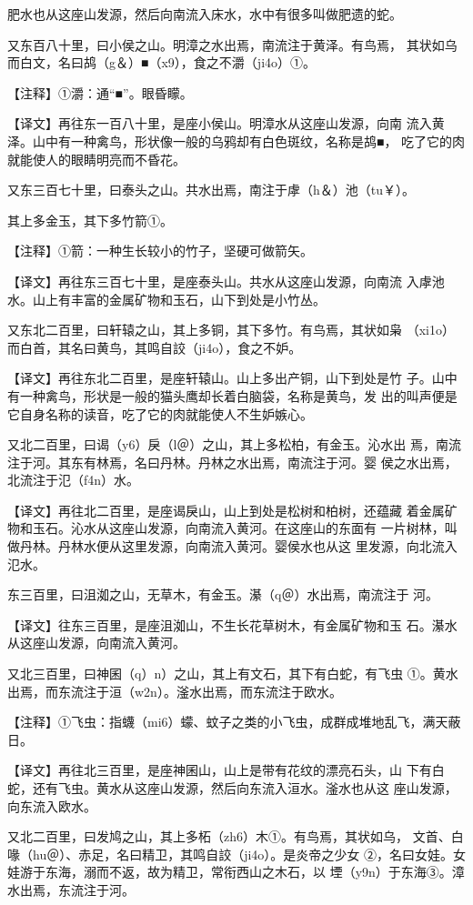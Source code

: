 \documentclass[a4paper,12pt,UTF8,twoside]{ctexbook}
\begin{document}
肥水也从这座山发源，然后向南流入床水，水中有很多叫做肥遗的蛇。

又东百八十里，曰小侯之山。明漳之水出焉，南流注于黄泽。有鸟焉， 其状如乌而白文，名曰鸪（g＆）■（x9），食之不灂（ji4o）①。

【注释】①灂：通“■”。眼昏矇。

【译文】再往东一百八十里，是座小侯山。明漳水从这座山发源，向南 流入黄泽。山中有一种禽鸟，形状像一般的乌鸦却有白色斑纹，名称是鸪■， 吃了它的肉就能使人的眼睛明亮而不昏花。

又东三百七十里，曰泰头之山。共水出焉，南注于虖（h＆）池（tu￥）。

其上多金玉，其下多竹箭①。

【注释】①箭：一种生长较小的竹子，坚硬可做箭矢。

【译文】再往东三百七十里，是座泰头山。共水从这座山发源，向南流 入虖池水。山上有丰富的金属矿物和玉石，山下到处是小竹丛。

又东北二百里，曰轩辕之山，其上多铜，其下多竹。有鸟焉，其状如枭 （xi1o）而白首，其名曰黄鸟，其鸣自詨（ji4o），食之不妒。

【译文】再往东北二百里，是座轩辕山。山上多出产铜，山下到处是竹 子。山中有一种禽鸟，形状是一般的猫头鹰却长着白脑袋，名称是黄鸟，发 出的叫声便是它自身名称的读音，吃了它的肉就能使人不生妒嫉心。

又北二百里，曰谒（y6）戾（l＠）之山，其上多松柏，有金玉。沁水出 焉，南流注于河。其东有林焉，名曰丹林。丹林之水出焉，南流注于河。婴 侯之水出焉，北流注于氾（f4n）水。

【译文】再往北二百里，是座谒戾山，山上到处是松树和柏树，还蕴藏 着金属矿物和玉石。沁水从这座山发源，向南流入黄河。在这座山的东面有 一片树林，叫做丹林。丹林水便从这里发源，向南流入黄河。婴侯水也从这 里发源，向北流入氾水。

东三百里，曰沮洳之山，无草木，有金玉。濝（q＠）水出焉，南流注于 河。

【译文】往东三百里，是座沮洳山，不生长花草树木，有金属矿物和玉 石。濝水从这座山发源，向南流入黄河。

又北三百里，曰神囷（q）n）之山，其上有文石，其下有白蛇，有飞虫 ①。黄水出焉，而东流注于洹（w2n）。滏水出焉，而东流注于欧水。

【注释】①飞虫：指蠛（mi6）蠓、蚊子之类的小飞虫，成群成堆地乱飞，满天蔽日。

【译文】再往北三百里，是座神囷山，山上是带有花纹的漂亮石头，山 下有白蛇，还有飞虫。黄水从这座山发源，然后向东流入洹水。滏水也从这 座山发源，向东流入欧水。

又北二百里，曰发鸠之山，其上多柘（zh6）木①。有鸟焉，其状如乌， 文首、白喙（hu＠）、赤足，名曰精卫，其鸣自詨（ji4o）。是炎帝之少女 ②，名曰女娃。女娃游于东海，溺而不返，故为精卫，常衔西山之木石，以 堙（y9n）于东海③。漳水出焉，东流注于河。
\end{document}
